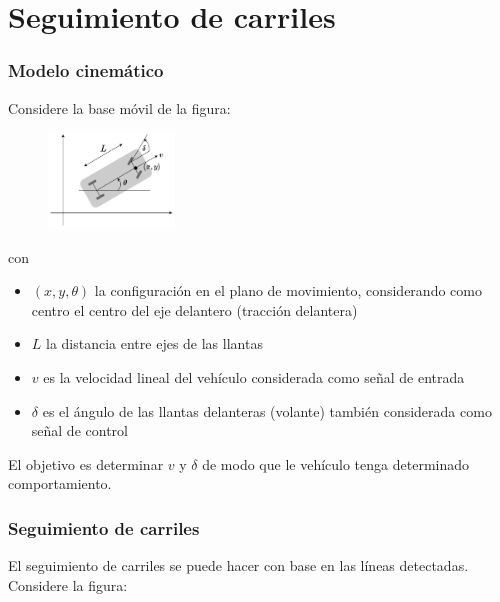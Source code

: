 \section{Seguimiento de carriles}

\begin{frame}\frametitle{Modelo cinemático}
  Considere la base móvil de la figura:
  \begin{figure}
    \centering
    \includegraphics[width=0.3\textwidth]{Figuras/Ackermann.pdf}
  \end{figure}
  con
  \begin{itemize}
  \item $(x,y,\theta)$ la configuración en el plano de movimiento, considerando como centro el centro del eje delantero (tracción delantera)
  \item $L$ la distancia entre ejes de las llantas
  \item $v$ es la velocidad lineal del vehículo considerada como señal de entrada
  \item $\delta$ es el ángulo de las llantas delanteras (volante) también considerada como señal de control
  \end{itemize}
  El objetivo es determinar $v$ y $\delta$ de modo que le vehículo tenga determinado comportamiento.
\end{frame}

\begin{frame}\frametitle{Seguimiento de carriles}
  El seguimiento de carriles se puede hacer con base en las líneas detectadas. Considere la figura:
  
\end{frame}
